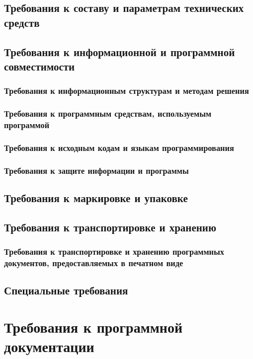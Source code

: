 \documentclass[12pt]{article}
\begin{document}
\subsection{Требования к составу и параметрам технических средств}

\subsection{Требования к информационной и программной совместимости}
\subsubsection{Требования к информационным структурам и методам решения}
\subsubsection{Требования к программным средствам, используемым программой}
\subsubsection{Требования к исходным кодам и языкам программирования}
\subsubsection{Требования к защите информации и программы}

\subsection{Требования к маркировке и упаковке}

\subsection{Требования к транспортировке и хранению}
\subsubsection{Требования к транспортировке и хранению программных документов, предоставляемых в печатном виде}

\subsection{Специальные требования}

\newpage
\section{Требования к программной документации}
\end{document}
